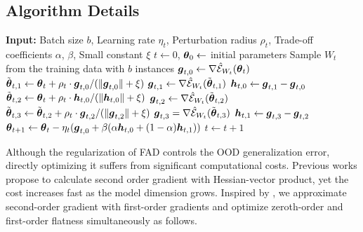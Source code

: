 \subsection{Algorithm Details} \label{sect:algorithm-detail}
\begin{algorithm}[t]
\caption{Flatness-Aware Minimization for Domain Generalization (FAD)}
\label{alg:all}
\begin{algorithmic}[1]
    \State \textbf{Input:} Batch size $b$, Learning rate $\eta_t$, Perturbation radius $\rho_t$, Trade-off coefficients $\alpha$, $\beta$, Small constant $\xi$
    \State $t \leftarrow 0$, $\boldsymbol{\theta}_0 \leftarrow$ initial parameters
        \State Sample $W_t$ from the training data with $b$ instances
        \State $\boldsymbol{g}_{t,0} \leftarrow \nabla \hat{\mathcal{E}}_{W_t}(\boldsymbol{\theta}_t)$
        \State $\tilde{\boldsymbol{\theta}}_{t,1} \leftarrow \boldsymbol{\theta}_t + \rho_t \cdot \boldsymbol{g}_{t,0} / (\|\boldsymbol{g}_{t,0}\|+\xi)$
        \State $\boldsymbol{g}_{t,1} \leftarrow \nabla \hat{\mathcal{E}}_{W_t}(\tilde{\boldsymbol{\theta}}_{t,1})$
        \State $\boldsymbol{h}_{t,0} \leftarrow \boldsymbol{g}_{t,1} - \boldsymbol{g}_{t,0}$ 
        \State $\tilde{\boldsymbol{\theta}}_{t,2} \leftarrow \boldsymbol{\theta}_t + \rho_t \cdot \boldsymbol{h}_{t,0} / (\|\boldsymbol{h}_{t,0}\|+\xi)$
        \State $\boldsymbol{g}_{t,2} \leftarrow \nabla \hat{\mathcal{E}}_{W_t}(\tilde{\boldsymbol{\theta}}_{t,2})$
        \State $\tilde{\boldsymbol{\theta}}_{t,3} \leftarrow \tilde{\boldsymbol{\theta}}_{t,2} + \rho_t \cdot \boldsymbol{g}_{t,2} / (\|\boldsymbol{g}_{t,2}\|+\xi)$
        \State $\boldsymbol{g}_{t,3} = \nabla \hat{\mathcal{E}}_{W_t}(\tilde{\boldsymbol{\theta}}_{t,3})$
        \State $\boldsymbol{h}_{t,1} \leftarrow \boldsymbol{g}_{t,3} - \boldsymbol{g}_{t,2}$ 
        \State $\boldsymbol{\theta}_{t+1} \leftarrow \boldsymbol{\theta}_t - \eta_t(\boldsymbol{g}_{t,0} + \beta(\alpha \boldsymbol{h}_{t,0} + (1 - \alpha)\boldsymbol{h}_{t,1}))$
        \State $t \leftarrow t + 1$
    \EndWhile
    \State {}
\end{algorithmic}
\end{algorithm}

Although the regularization of FAD controls the OOD generalization error, directly optimizing it 
suffers from significant computational costs.
Previous works \cite{yao2020pyhessian,Zhang2023GradientNA} propose to calculate second order gradient with Hessian-vector product, yet the cost increases fast as the model dimension grows. Inspired by \cite{singh2020woodfisher,zhao2022penalizing}, we approximate second-order gradient with first-order gradients and optimize zeroth-order and first-order flatness simultaneously as follows. 


